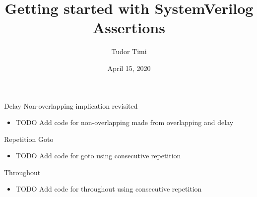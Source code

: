 \documentclass{beamer}
\title{Getting started with SystemVerilog Assertions}
\author{Tudor Timi}
\institute{VerificationGentleman.com}
\date{April 15, 2020}
\begin{document}
\begin{frame}{Delay}
Non-overlapping implication revisited

\begin{itemize}
 \item TODO Add code for non-overlapping made from overlapping and delay
\end{itemize}
\end{frame}


\begin{frame}{Repetition}
Goto

\begin{itemize}
 \item TODO Add code for goto using consecutive repetition
\end{itemize}
\end{frame}


\begin{frame}{Throughout}
\begin{itemize}
 \item TODO Add code for throughout using consecutive repetition
\end{itemize}
\end{frame}
\end{document}
